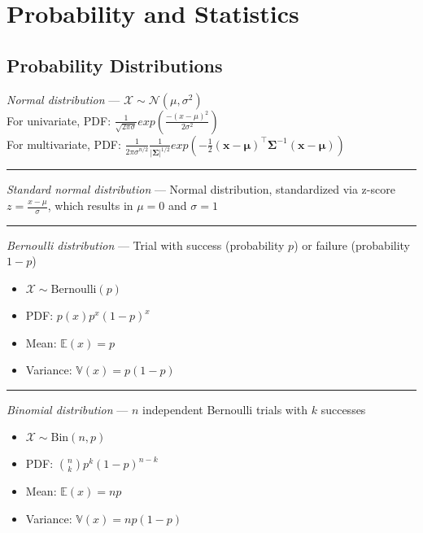 \section{Probability and Statistics}
\subsection*{Probability Distributions}
\emph{Normal distribution} --- 
$\mathcal{X} \sim \mathcal{N}(\mu, \sigma^2)$\\
For univariate, PDF: $\frac{1}{\sqrt{2\pi\sigma}} exp(\frac{-(x-\mu)^2}{2\sigma^2})$\\
For multivariate, PDF: $\frac{1}{{2\pi\sigma}^{n/2}} \frac{1}{|\boldsymbol{\Sigma}|^{1/2}} exp(-\frac{1}{2} (\boldsymbol{x}-\boldsymbol{\mu})^\intercal \boldsymbol{\Sigma}^{-1} (\boldsymbol{x}-\boldsymbol{\mu}))$

{\color{lightgray}\hrule height 0.001mm}

\emph{Standard normal distribution} --- Normal distribution, standardized via z-score $z = \frac{x-\mu}{\sigma}$, which results in $\mu = 0$ and $\sigma = 1$

{\color{lightgray}\hrule height 0.001mm}

\emph{Bernoulli distribution} --- Trial with success (probability $p$) or failure (probability $1-p$)
\begin{multicols}{2}
\begin{itemize}
    \item $\mathcal{X} \sim \textrm{Bernoulli}(p)$
    \item PDF: $p(x) p^x (1-p)^x$
    \item Mean: $\mathbb{E}(x) = p$
    \item Variance: $\mathbb{V}(x) = p(1-p)$
\end{itemize}
\end{multicols}

{\color{lightgray}\hrule height 0.001mm}

\emph{Binomial distribution} --- $n$ independent Bernoulli trials with $k$ successes
\begin{multicols}{2}
\begin{itemize}
    \item $\mathcal{X} \sim \textrm{Bin}(n,p)$
    \item PDF: $\binom{n}{k} p^k (1-p)^{n-k}$
    \item Mean: $\mathbb{E}(x) = np$
    \item Variance: $\mathbb{V}(x) = np(1-p)$
\end{itemize}
\end{multicols}

